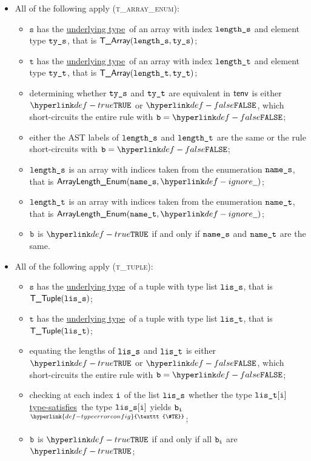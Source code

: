 \documentclass{book}
\newcommand\TypeErrorConfig[0]{\hyperlink{def-typeerrorconfig}{\texttt{\#TE}}}
\newcommand\ProseOrTypeError[0]{\hyperlink{def-proseortypeerror}{$^{\TypeErrorConfig}$}}
\newcommand\underlyingtype[0]{\hyperlink{def-underlyingtype}{underlying type}}
\newcommand\typesatisfies[0]{\hyperlink{def-typesatisfies}{type-satisfies}}
\newcommand\vt[0]{\texttt{t}}
\newcommand\vs[0]{\texttt{s}}
\begin{document}
\begin{itemize}
  \item All of the following apply (\textsc{t\_array\_enum}):
  \begin{itemize}
  \item $\vs$ has the \underlyingtype\ of an array with index $\texttt{length\_s}$ and element type $\texttt{ty\_s}$, that is $\textsf{T\_Array}(\texttt{length\_s}, \texttt{ty\_s})$;
  \item $\vt$ has the \underlyingtype\ of an array with index $\texttt{length\_t}$ and element type $\texttt{ty\_t}$, that is $\textsf{T\_Array}(\texttt{length\_t}, \texttt{ty\_t})$;
  \item determining whether $\texttt{ty\_s}$ and $\texttt{ty\_t}$ are equivalent in $\textsf{tenv}$ is either $\True$
  or $\False$, which short-circuits the entire rule with $\vb=\False$;
  \item either the AST labels of $\texttt{length\_s}$ and $\texttt{length\_t}$ are the same or the rule short-circuits with $\vb=\False$;
  \item $\texttt{length\_s}$ is an array with indices taken from the enumeration $\texttt{name\_s}$, that is $\ArrayLengthEnum(\vnames, \Ignore)$;
  \item $\texttt{length\_t}$ is an array with indices taken from the enumeration $\texttt{name\_t}$, that is $\ArrayLengthEnum(\vnamet, \Ignore)$;
  \item $\texttt{b}$ is $\True$ if and only if $\texttt{name\_s}$ and $\texttt{name\_t}$ are the same.
  \end{itemize}

\item All of the following apply (\textsc{t\_tuple}):
  \begin{itemize}
  \item $\vs$ has the \underlyingtype\ of a tuple with type list $\texttt{lis\_s}$, that is $\textsf{T\_Tuple}(\texttt{lis\_s})$;
  \item $\vt$ has the \underlyingtype\ of a tuple with type list $\texttt{lis\_t}$, that is $\textsf{T\_Tuple}(\texttt{lis\_t})$;
  \item equating the lengths of $\texttt{lis\_s}$ and $\texttt{lis\_t}$ is either $\True$ or $\False$, which short-circuits
  the entire rule with $\vb=\False$;
  \item checking at each index $\texttt{i}$ of the list $\texttt{lis\_s}$ whether the type $\texttt{lis\_t}[\texttt{i}]$ \typesatisfies\ the type $\texttt{lis\_s}[\texttt{i}]$
  yields $\texttt{b}_{\texttt{i}}$ \ProseOrTypeError;
  \item $\texttt{b}$ is $\True$ if and only if all $\texttt{b}_{\texttt{i}}$ are $\True$;
  \end{itemize}


\end{itemize}
\end{document}
